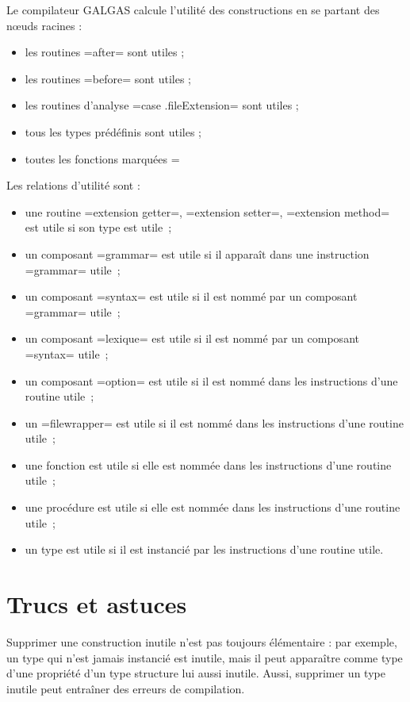 Le compilateur GALGAS calcule l'utilité des constructions en se partant des nœuds racines :
\begin{itemize}
  \item les routines \ggsq=after= sont utiles ;
  \item les routines \ggsq=before= sont utiles ;
  \item les routines d'analyse \ggsq=case .fileExtension= sont utiles ;
  \item tous les types prédéfinis sont utiles ;
  \item toutes les fonctions marquées \ggsq=%
\end{itemize}

Les relations d'utilité sont :
\begin{itemize}
  \item une routine \ggsq=extension getter=, \ggsq=extension setter=, \ggsq=extension method= est utile si son type est utile~;
  \item un composant \ggsq=grammar= est utile si il apparaît dans une instruction \ggsq=grammar= utile~;
  \item un composant \ggsq=syntax= est utile si il est nommé par un composant \ggsq=grammar= utile~;
  \item un composant \ggsq=lexique= est utile si il est nommé par un composant \ggsq=syntax= utile~;
  \item un composant \ggsq=option= est utile si il est nommé dans les instructions d'une routine utile~;
  \item un  \ggsq=filewrapper= est utile si il est nommé dans les instructions d'une routine utile~;
  \item une fonction est utile si elle est nommée dans les instructions d'une routine utile~;
  \item une procédure est utile si elle est nommée dans les instructions d'une routine utile~;
  \item un type est utile si il est instancié par les instructions d'une routine utile.
\end{itemize}



\section{Trucs et astuces}

Supprimer une construction inutile n'est pas toujours élémentaire : par exemple, un type qui n'est jamais instancié est inutile, mais il peut apparaître comme type d'une propriété d'un type structure lui aussi inutile. Aussi, supprimer un type inutile peut entraîner des erreurs de compilation.

